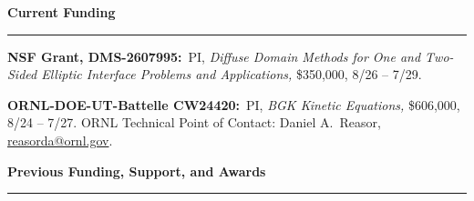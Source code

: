 \documentclass[10pt,letterpaper]{article}
\newcommand{\cvsection}[1]{%
  \Needspace{5\baselineskip}\par\vspace{13pt}%
  {\color{Smokey}\fontsize{15}{17}\selectfont\bfseries #1}\par\vspace{3pt}%
  {\color{UTOrange}\rule{\linewidth}{1.8pt}}\par\vspace{4pt}%
}
\begin{document}
	\smallskip

	
\cvsection{Current Funding}
    \begin{description}
    
	\item
\textbf{NSF Grant, DMS-2607995:}~PI, {\sl Diffuse Domain Methods for One and Two-Sided Elliptic Interface Problems and Applications,} \$350,000, 8/26 -- 7/29.
    
    \item
\textbf{ORNL-DOE-UT-Battelle CW24420:}~PI, {\sl BGK Kinetic Equations,} \$606,000, 8/24 -- 7/27. ORNL Technical Point of Contact: Daniel A.~Reasor, \href{mailto:reasorda@ornl.gov}{reasorda@ornl.gov}.
    
    \end{description}
    
\cvsection{Previous Funding, Support, and Awards}
\end{document}
